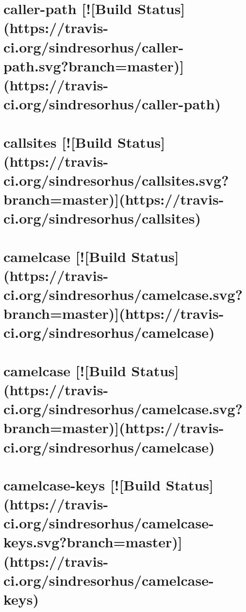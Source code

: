 \documentclass[twoside]{book}
\newcommand{\+}{\discretionary{\mbox{\scriptsize$\hookleftarrow$}}{}{}}
\begin{document}
\chapter{caller-\/path \mbox{[}!\mbox{[}Build Status\mbox{]}(https\+://travis-\/ci.org/sindresorhus/caller-\/path.svg?branch=master)\mbox{]}(https\+://travis-\/ci.org/sindresorhus/caller-\/path)}
\label{md__c_1_workspace_demo_src_main_script_node_modules_caller-path_readme}

\chapter{callsites \mbox{[}!\mbox{[}Build Status\mbox{]}(https\+://travis-\/ci.org/sindresorhus/callsites.svg?branch=master)\mbox{]}(https\+://travis-\/ci.org/sindresorhus/callsites)}
\label{md__c_1_workspace_demo_src_main_script_node_modules_callsites_readme}

\chapter{camelcase \mbox{[}!\mbox{[}Build Status\mbox{]}(https\+://travis-\/ci.org/sindresorhus/camelcase.svg?branch=master)\mbox{]}(https\+://travis-\/ci.org/sindresorhus/camelcase)}
\label{md__c_1_workspace_demo_src_main_script_node_modules_camelcase_readme}

\chapter{camelcase \mbox{[}!\mbox{[}Build Status\mbox{]}(https\+://travis-\/ci.org/sindresorhus/camelcase.svg?branch=master)\mbox{]}(https\+://travis-\/ci.org/sindresorhus/camelcase)}
\label{md__c_1_workspace_demo_src_main_script_node_modules_camelcase-keys_node_modules_camelcase_readme}

\chapter{camelcase-\/keys \mbox{[}!\mbox{[}Build Status\mbox{]}(https\+://travis-\/ci.org/sindresorhus/camelcase-\/keys.svg?branch=master)\mbox{]}(https\+://travis-\/ci.org/sindresorhus/camelcase-\/keys)}
\label{md__c_1_workspace_demo_src_main_script_node_modules_camelcase-keys_readme}

\end{document}
